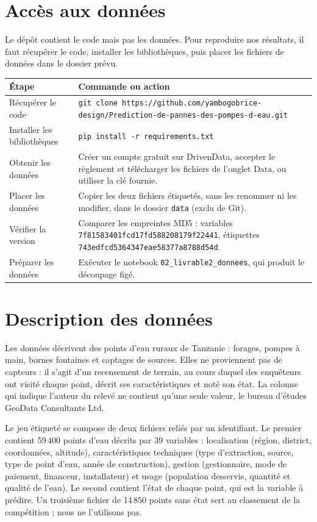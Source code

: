 \documentclass[10pt,a4paper]{article}
\begin{document}
\section{Accès aux données}
Le dépôt contient le code mais pas les données. Pour reproduire nos résultats, il faut récupérer le code, installer les bibliothèques, puis placer les fichiers de données dans le dossier prévu.

\smallskip
\begin{tabularx}{\textwidth}{@{}p{5.2cm}L@{}}
\toprule
Étape & Commande ou action \\
\midrule
Récupérer le code & \texttt{git clone https://github.com/yambogobrice-design/\allowbreak Prediction-de-pannes-des-pompes-d-eau.git} \\
Installer les bibliothèques & \texttt{pip install -r requirements.txt} \\
Obtenir les données & Créer un compte gratuit sur DrivenData, accepter le règlement et télécharger les fichiers de l'onglet Data, ou utiliser la clé fournie. \\
Placer les données & Copier les deux fichiers étiquetés, sans les renommer ni les modifier, dans le dossier \texttt{data} (exclu de Git). \\
Vérifier la version & Comparer les empreintes MD5 : variables \texttt{7f81583401fcd17fd588208179f22441}, étiquettes \texttt{743edfcd5364347eae58377a8788d54d}. \\
Préparer les données & Exécuter le notebook \texttt{02\_livrable2\_donnees}, qui produit le découpage figé. \\
\bottomrule
\end{tabularx}

\section{Description des données}
Les données décrivent des points d'eau ruraux de Tanzanie : forages, pompes à main, bornes fontaines et captages de sources. Elles ne proviennent pas de capteurs : il s'agit d'un recensement de terrain, au cours duquel des enquêteurs ont visité chaque point, décrit ses caractéristiques et noté son état. La colonne qui indique l'auteur du relevé ne contient qu'une seule valeur, le bureau d'études GeoData Consultants Ltd.

Le jeu étiqueté se compose de deux fichiers reliés par un identifiant. Le premier contient 59\,400 points d'eau décrits par 39 variables : localisation (région, district, coordonnées, altitude), caractéristiques techniques (type d'extraction, source, type de point d'eau, année de construction), gestion (gestionnaire, mode de paiement, financeur, installateur) et usage (population desservie, quantité et qualité de l'eau). Le second contient l'état de chaque point, qui est la variable à prédire. Un troisième fichier de 14\,850 points sans état sert au classement de la compétition ; nous ne l'utilisons pas.
\end{document}
